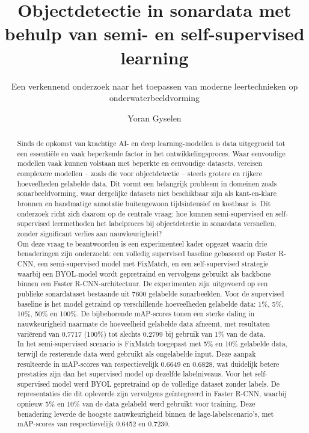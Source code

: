 \documentclass[a0,portrait]{hogent-poster}
\title{Objectdetectie in sonardata met behulp van semi- en self-supervised learning}
\subtitle{Een verkennend onderzoek naar het toepassen van moderne leertechnieken op onderwaterbeeldvorming}
\author{Yoran Gyselen}
\begin{document}
\maketitle

\begin{abstract}
Sinds de opkomst van krachtige AI- en deep learning-modellen is data uitgegroeid tot een essentiële en vaak beperkende factor in het ontwikkelingsproces. Waar eenvoudige modellen vaak kunnen volstaan met beperkte en eenvoudige datasets, vereisen complexere modellen -- zoals die voor objectdetectie -- steeds grotere en rijkere hoeveelheden gelabelde data. Dit vormt een belangrijk probleem in domeinen zoals sonarbeeldvorming, waar dergelijke datasets niet beschikbaar zijn als kant-en-klare bronnen en handmatige annotatie buitengewoon tijdsintensief en kostbaar is. Dit onderzoek richt zich daarom op de centrale vraag: hoe kunnen semi-supervised en self-supervised leermethoden het labelproces bij objectdetectie in sonardata versnellen, zonder significant verlies aan nauwkeurigheid? \\

Om deze vraag te beantwoorden is een experimenteel kader opgezet waarin drie benaderingen zijn onderzocht: een volledig supervised baseline gebaseerd op Faster R-CNN, een semi-supervised model met FixMatch, en een self-supervised strategie waarbij een BYOL-model wordt gepretraind en vervolgens gebruikt als backbone binnen een Faster R-CNN-architectuur. De experimenten zijn uitgevoerd op een publieke sonardataset bestaande uit 7600 gelabelde sonarbeelden. Voor de supervised baseline is het model getraind op verschillende hoeveelheden gelabelde data: 1\%, 5\%, 10\%, 50\% en 100\%. De bijbehorende mAP-scores tonen een sterke daling in nauwkeurigheid naarmate de hoeveelheid gelabelde data afneemt, met resultaten variërend van 0.7717 (100\%) tot slechts 0.2799 bij gebruik van 1\% van de data. \\

In het semi-supervised scenario is FixMatch toegepast met 5\% en 10\% gelabelde data, terwijl de resterende data werd gebruikt als ongelabelde input. Deze aanpak resulteerde in mAP-scores van respectievelijk 0.6649 en 0.6828, wat duidelijk betere prestaties zijn dan het supervised model op dezelfde labelniveaus. Voor het self-supervised model werd BYOL gepretraind op de volledige dataset zonder labels. De representaties die dit opleverde zijn vervolgens geïntegreerd in Faster R-CNN, waarbij opnieuw 5\% en 10\% van de data gelabeld werd gebruikt voor training. Deze benadering leverde de hoogste nauwkeurigheid binnen de lage-labelscenario's, met mAP-scores van respectievelijk 0.6452 en 0.7230. \\


\end{abstract}
\end{document}

